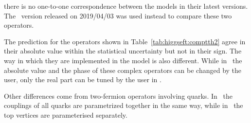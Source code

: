    there is no one-to-one correspondence between the models in their latest versions. The \SMEFTatNLO\ version released on 2019/04/03 was used instead to compare these two operators.
\begin{center}
  \begin{table}[h!]
    \caption{ Comparison of the SM and interference predictions for the $pp\to t\bar{t} H$ process between the \SMEFTsim\ and \SMEFTatNLO\ for \ctB\ (\cuBAbs) and \ctW\ (\cuWAbs). The operator definition are given in the way they are implemented in \SMEFTatNLO\ .}
    \label{tab:higgseft:comptth2}
\end{table}
\end{center}
The prediction for the operators shown in Table~\ref{tab:higgseft:comptth2} agree in their absolute value within the statistical uncertainty but not in their sign. The way in which they are implemented in the model is also different. While in \SMEFTsim\ the absolute value and the phase of these complex operators can be changed by the user, only the real part can be tuned by the user in \SMEFTatNLO.

Other differences come from two-fermion operators involving quarks. In \SMEFTsim\ the couplings of all quarks are parametrized together in the same way, while in \SMEFTatNLO\ the top vertices are parameterised separately. 


